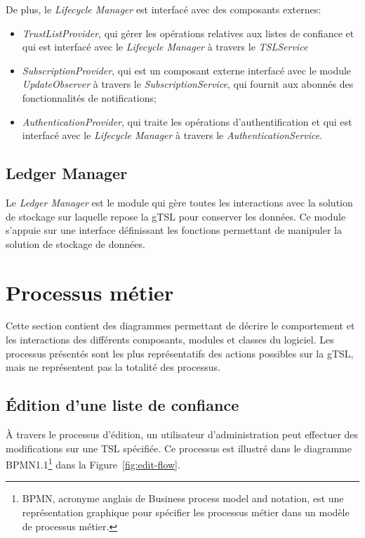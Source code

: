 \documentclass{tnreport}
\begin{document}
De plus, le \textit{Lifecycle Manager} est interfacé avec des composants externes:
\begin{itemize}
	\item \textit{TrustListProvider}, qui gérer les opérations relatives aux listes de confiance et qui est interfacé avec le \textit{Lifecycle Manager} à travers le \textit{TSLService}
	\item \textit{SubscriptionProvider}, qui est un composant externe interfacé avec le module \textit{UpdateObserver} à travers le \textit{SubscriptionService}, qui fournit aux abonnés des fonctionnalités de notifications;
	\item \textit{AuthenticationProvider}, qui traite les opérations d'authentification et qui est interfacé avec le \textit{Lifecycle Manager} à travers le \textit{AuthenticationService}.
\end{itemize}

\subsection{Ledger Manager}

Le\textit{ Ledger Manager} est le module qui gère toutes les interactions avec la solution de stockage sur laquelle repose la gTSL pour conserver les données. Ce module s'appuie sur une interface définissant les fonctions permettant de manipuler la solution de stockage de données.

\section{Processus métier}

Cette section contient des diagrammes permettant de décrire le comportement et les interactions des différents composants, modules et classes du logiciel. Les processus présentés sont les plus représentatifs des actions possibles sur la gTSL, mais ne représentent pas la totalité des processus.

\subsection{Édition d'une liste de confiance}

À travers le processus d'édition, un utilisateur d'administration peut effectuer des modifications sur une TSL spécifiée.
Ce processus est illustré dans le diagramme BPMN1.1\footnote{BPMN, acronyme anglais de Business process model and notation, est une représentation graphique pour spécifier les processus métier dans un modèle de processus métier.} dans la Figure~\ref{fig:edit-flow}.
\end{document}
